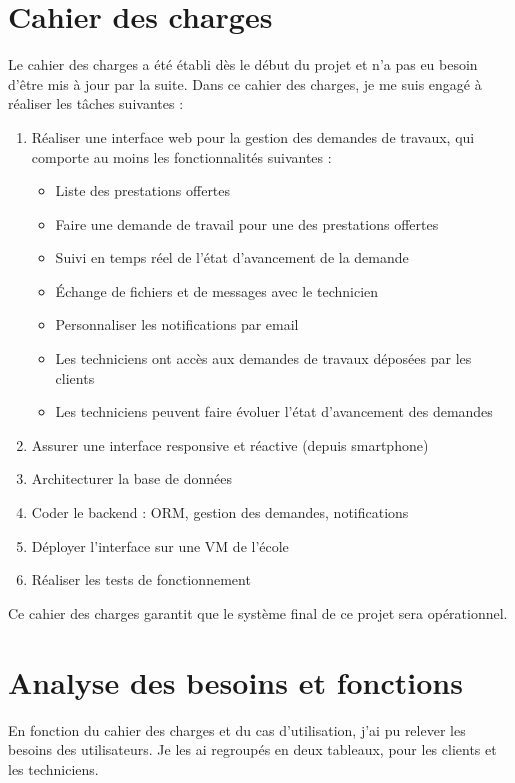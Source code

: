 \documentclass[
    iai, %
    eai, %
]{heig-tb}
\begin{document}
\newpage
\section{Cahier des charges}
Le cahier des charges a été établi dès le début du projet et n'a pas eu besoin d'être mis à jour par la suite.
Dans ce cahier des charges, je me suis engagé à réaliser les tâches suivantes :

\begin{enumerate}
  \item Réaliser une interface web pour la gestion des demandes de travaux, qui comporte au moins les fonctionnalités suivantes :
        \begin{itemize}
          \item Liste des prestations offertes
          \item Faire une demande de travail pour une des prestations offertes
          \item Suivi en temps réel de l'état d'avancement de la demande
          \item Échange de fichiers et de messages avec le technicien
          \item Personnaliser les notifications par email
          \item Les techniciens ont accès aux demandes de travaux déposées par les clients
          \item Les techniciens peuvent faire évoluer l'état d'avancement des demandes
        \end{itemize}
  \item Assurer une interface responsive et réactive (depuis smartphone)
  \item Architecturer la base de données
  \item Coder le backend : ORM, gestion des demandes, notifications
  \item Déployer l'interface sur une VM de l'école
  \item Réaliser les tests de fonctionnement
\end{enumerate}
\bigskip
Ce cahier des charges garantit que le système final de ce projet sera opérationnel.

\newpage
\section{Analyse des besoins et fonctions}
En fonction du cahier des charges et du cas d'utilisation, j'ai pu relever les besoins des utilisateurs.
Je les ai regroupés en deux tableaux, pour les clients et les techniciens.
\end{document}
